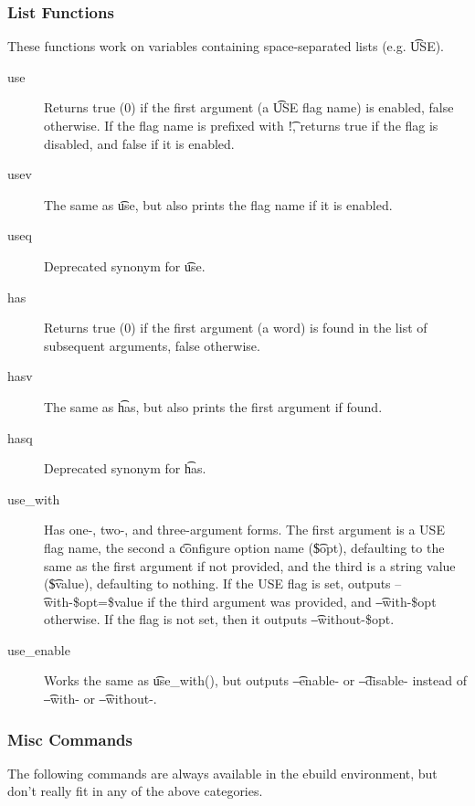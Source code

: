 \subsubsection{List Functions}
These functions work on variables containing space-separated lists (e.g. \t{USE}).

\begin{description}
\item[use] Returns true (0) if the first argument (a \t{USE} flag name) is enabled, false otherwise.
    If the flag name is prefixed with \t{!}, returns true if the flag is disabled, and false if it
    is enabled.
\item[usev] The same as \t{use}, but also prints the flag name if it is enabled.
\item[useq] Deprecated synonym for \t{use}.
\\
\item[has] Returns true (0) if the first argument (a word) is found in the list of subsequent
    arguments, false otherwise.
\item[hasv] The same as \t{has}, but also prints the first argument if found.
\item[hasq] Deprecated synonym for \t{has}.
\\
\item[use\_with] Has one-, two-, and three-argument forms. The first argument is a USE flag name,
    the second a \t{configure} option name (\t{\$opt}), defaulting to the same as the first argument
    if not provided, and the third is a string value (\t{\$value}), defaulting to nothing. If the
    USE flag is set, outputs \t{--with-\$opt=\$value} if the third argument was provided, and
    \t{--with-\$opt} otherwise. If the flag is not set, then it outputs \t{--without-\$opt}.

\item[use\_enable] Works the same as \t{use\_with()}, but outputs \t{--enable-} or \t{--disable-}
instead of \t{--with-} or \t{--without-}.
\end{description}

\subsubsection{Misc Commands}
The following commands are always available in the ebuild environment, but don't really fit in any
of the above categories.

